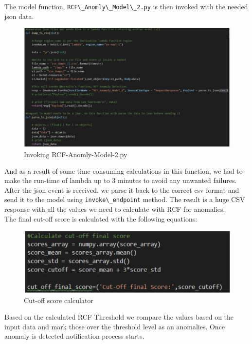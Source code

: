 The model function, \verb|RCF\_Anomly\_Model\_2.py| is then invoked with the needed json data. 
\begin{figure}[h]

    \centering
    \includegraphics[width=1\textwidth]{images/json-generator.png}
    \caption{Invoking RCF-Anomly-Model-2.py}
    \label{fig:json_generator}
\end{figure}
And as a result of some time consuming calculations in this function, we had to make the run-time of lambda up to 3 minutes to avoid any unwanted failures.\\
After the json event is received, we parse it back to the correct csv format and send it to the model using \verb|invoke\_endpoint| method. The result is a huge CSV response with all the values we need to calculate with RCF for anomalies.\\
The final cut-off score is calculated with the following equations:
\begin{figure}[h]
    \centering
    \includegraphics[width=1\textwidth]{images/cutt-off-calculator.png}
    \caption{Cut-off score calculator}
    \label{fig:cut_off_calculator}
\end{figure}
Based on the calculated RCF Threshold we compare the values based on the input data and mark those over the threshold level as an anomalies. Once anomaly is detected notification process starts.\\
